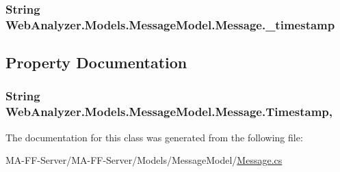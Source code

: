 \subsubsection[{\+\_\+timestamp}]{\setlength{\rightskip}{0pt plus 5cm}String Web\+Analyzer.\+Models.\+Message\+Model.\+Message.\+\_\+timestamp\hspace{0.3cm}{\ttfamily [private]}}\label{class_web_analyzer_1_1_models_1_1_message_model_1_1_message_ae1e243f35e213e08ec2bdc54f64b0d2e}


\subsection{Property Documentation}
\hypertarget{class_web_analyzer_1_1_models_1_1_message_model_1_1_message_a9054d90256bf9ad8de33d975d2a188d3}{}
\subsubsection[{Timestamp}]{\setlength{\rightskip}{0pt plus 5cm}String Web\+Analyzer.\+Models.\+Message\+Model.\+Message.\+Timestamp\hspace{0.3cm}{\ttfamily [get]}, {\ttfamily [set]}}\label{class_web_analyzer_1_1_models_1_1_message_model_1_1_message_a9054d90256bf9ad8de33d975d2a188d3}


The documentation for this class was generated from the following file\+:\begin{DoxyCompactItemize}
\item 
M\+A-\/\+F\+F-\/\+Server/\+M\+A-\/\+F\+F-\/\+Server/\+Models/\+Message\+Model/\hyperlink{_message_8cs}{Message.\+cs}\end{DoxyCompactItemize}
